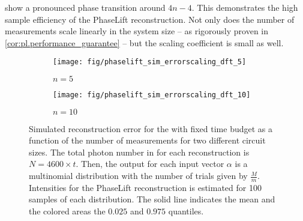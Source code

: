  show a pronounced phase transition around $4n - 4$.
This demonstrates the high sample efficiency of the PhaseLift reconstruction.
Not only does the number of measurements scale linearly in the system size -- as rigorously proven in \cref{cor:pl.performance_guarantee} -- but the scaling coefficient is small as well.\\

\begin{figure*}[tbp]
  \begin{subfigure}{.475\columnwidth}
    \texttt{[image: fig/phaselift\_sim\_errorscaling\_dft\_5]}
    \caption{\label{sfig:pl.simerror.five}%
      $n = 5$
    }
   \end{subfigure}
  \begin{subfigure}{.475\columnwidth}
    \texttt{[image: fig/phaselift\_sim\_errorscaling\_dft\_10]}
    \caption{\label{sfig:pl.simerror.ten}%
      $n = 10$
    }
   \end{subfigure}
  \caption{\label{fig:pl.simerror}%
    Simulated reconstruction error for the with fixed time budget as a function of the number of measurements for two different circuit sizes.
    The total photon number in for each reconstruction is $N = 4600 \times t$.
    Then, the output for each input vector $\alpha$ is a multinomial distribution with the number of trials given by $\frac{M}{m}$.
    Intensities for the PhaseLift reconstruction is estimated for 100 samples of each distribution.
    The solid line indicates the mean and the colored areas the $0.025$ and $0.975$ quantiles.
  }
\end{figure*}


